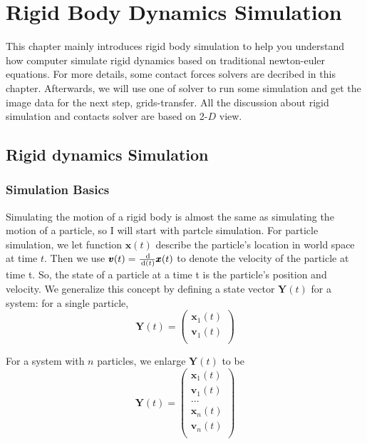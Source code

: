 \chapter{Rigid Body Dynamics Simulation}

This chapter mainly introduces rigid body simulation to help you understand how computer simulate rigid dynamics based on traditional newton-euler equations. For more details, some contact forces solvers are decribed in this chapter. Afterwards, we will use one of solver to run some simulation and get the image data for the next step, grids-transfer. All the discussion about rigid simulation and contacts solver are based on 2-$D$ view.

\section{Rigid dynamics Simulation}

\subsection{Simulation Basics}

Simulating the motion of a rigid body is almost the same as simulating the motion of a particle, so I will start with partcle simulation. For particle simulation, we let function $\pmb{x}(t)$ describe the particle's location in world space at time $t$. Then we use $\pmb{v}(t)=\frac{\,\mathrm{d}}{\,\mathrm{d}(t)}\pmb{x}(t)$
to denote the velocity of the particle at time t. So, the state of a particle at a time t is the particle's position and velocity. We generalize this concept by defining a state vector $\textbf{Y}(t)$ for a system: for a single particle,
\begin{equation}
    \textbf{Y}(t) = \left(
        \begin{array}{c}
            \pmb{x}_{1}(t) \\
            \pmb{v}_{1}(t) \\
        \end{array}
    \right)
\end{equation}

For a system with $n$ particles, we enlarge $\textbf{Y}(t)$ to be
\begin{equation}
    \textbf{Y}(t) = \left(
    \begin{array}{c}
        \pmb{x}_{1}(t) \\
        \pmb{v}_{1}(t) \\
        ... \\
        \pmb{x}_{n}(t) \\
        \pmb{v}_{n}(t) \\
    \end{array}
    \right)
\end{equation}

